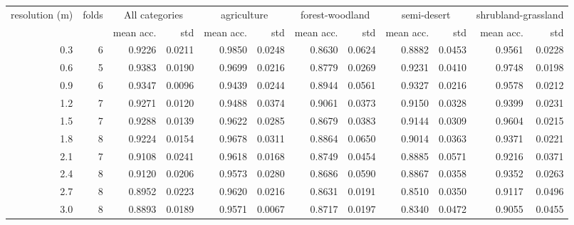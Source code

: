 \begin{tabular}{rrrrrrrrrrrr}
\toprule
resolution (m) &  folds & \multicolumn{2}{c}{All categories} & \multicolumn{2}{c}{agriculture} & \multicolumn{2}{c}{forest-woodland} & \multicolumn{2}{c}{semi-desert} & \multicolumn{2}{c}{shrubland-grassland} \\
           &  &     mean acc. &    std &                 mean acc. &    std &                     mean acc. &    std &                 mean acc. &    std &                         mean acc. &    std \\
\midrule
       0.3 &     6 &   0.9226 & 0.0211 &               0.9850 & 0.0248 &                   0.8630 & 0.0624 &               0.8882 & 0.0453 &                       0.9561 & 0.0228 \\
       0.6 &     5 &   0.9383 & 0.0190 &               0.9699 & 0.0216 &                   0.8779 & 0.0269 &               0.9231 & 0.0410 &                       0.9748 & 0.0198 \\
       0.9 &     6 &   0.9347 & 0.0096 &               0.9439 & 0.0244 &                   0.8944 & 0.0561 &               0.9327 & 0.0216 &                       0.9578 & 0.0212 \\
       1.2 &     7 &   0.9271 & 0.0120 &               0.9488 & 0.0374 &                   0.9061 & 0.0373 &               0.9150 & 0.0328 &                       0.9399 & 0.0231 \\
       1.5 &     7 &   0.9288 & 0.0139 &               0.9622 & 0.0285 &                   0.8679 & 0.0383 &               0.9144 & 0.0309 &                       0.9604 & 0.0215 \\
       1.8 &     8 &   0.9224 & 0.0154 &               0.9678 & 0.0311 &                   0.8864 & 0.0650 &               0.9014 & 0.0363 &                       0.9371 & 0.0221 \\
       2.1 &     7 &   0.9108 & 0.0241 &               0.9618 & 0.0168 &                   0.8749 & 0.0454 &               0.8885 & 0.0571 &                       0.9216 & 0.0371 \\
       2.4 &     8 &   0.9120 & 0.0206 &               0.9573 & 0.0280 &                   0.8686 & 0.0590 &               0.8867 & 0.0358 &                       0.9352 & 0.0263 \\
       2.7 &     8 &   0.8952 & 0.0223 &               0.9620 & 0.0216 &                   0.8631 & 0.0191 &               0.8510 & 0.0350 &                       0.9117 & 0.0496 \\
       3.0 &     8 &   0.8893 & 0.0189 &               0.9571 & 0.0067 &                   0.8717 & 0.0197 &               0.8340 & 0.0472 &                       0.9055 & 0.0455 \\

\end{tabular}
